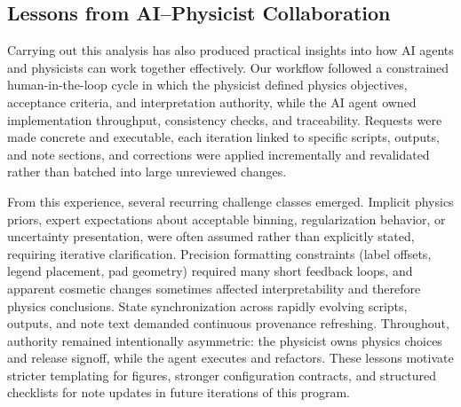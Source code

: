 \subsection*{Lessons from AI--Physicist Collaboration}

Carrying out this analysis has also produced practical insights into how AI agents and physicists can work together effectively. Our workflow followed a constrained human-in-the-loop cycle in which the physicist defined physics objectives, acceptance criteria, and interpretation authority, while the AI agent owned implementation throughput, consistency checks, and traceability. Requests were made concrete and executable, each iteration linked to specific scripts, outputs, and note sections, and corrections were applied incrementally and revalidated rather than batched into large unreviewed changes.

From this experience, several recurring challenge classes emerged. Implicit physics priors, expert expectations about acceptable binning, regularization behavior, or uncertainty presentation, were often assumed rather than explicitly stated, requiring iterative clarification. Precision formatting constraints (label offsets, legend placement, pad geometry) required many short feedback loops, and apparent cosmetic changes sometimes affected interpretability and therefore physics conclusions. State synchronization across rapidly evolving scripts, outputs, and note text demanded continuous provenance refreshing. Throughout, authority remained intentionally asymmetric: the physicist owns physics choices and release signoff, while the agent executes and refactors. These lessons motivate stricter templating for figures, stronger configuration contracts, and structured checklists for note updates in future iterations of this program.
